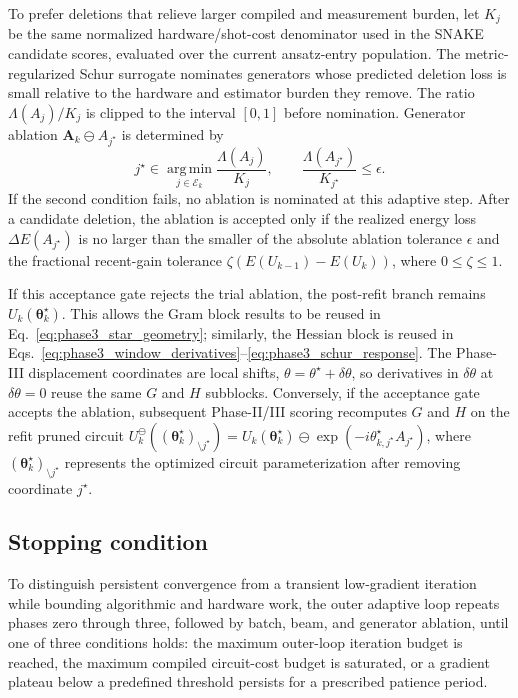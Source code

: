 \documentclass[
  reprint,
  amsmath,
  amssymb,
  aps,
  pra,
  nofootinbib,
  superscriptaddress,
  floatfix
]{revtex4-2}
\begin{document}
To prefer deletions that relieve larger compiled and measurement burden, let
\(K_j\) be the same normalized hardware/shot-cost denominator used in the SNAKE
candidate scores, evaluated over the current ansatz-entry population. The
metric-regularized Schur surrogate nominates generators whose predicted
deletion loss is small relative to the hardware and estimator burden they
remove. The ratio
\(\Lambda(A_j)/K_j\) is clipped to the interval \([0,1]\) before nomination.
Generator ablation \(\mathbf A_k\ominus A_{j^\star}\) is determined by
\begin{equation*}
j^\star
\in
\operatorname*{arg\,min}_{j\in\mathcal E_k}
\frac{\Lambda(A_j)}{K_j},
\qquad
\frac{\Lambda(A_{j^\star})}{K_{j^\star}}
\le
\epsilon .
\end{equation*}
If the second condition fails, no ablation is nominated at this adaptive step.
After a candidate deletion, the ablation is accepted only if the realized energy
loss \(\Delta E(A_{j^\star})\) is no larger than the smaller of the absolute
ablation tolerance \(\epsilon\) and the fractional recent-gain tolerance
\(\zeta\left(E(U_{k-1})-E(U_k)\right)\), where \(0\le\zeta\le1\).

If this acceptance gate rejects the trial ablation, the post-refit
branch remains \(U_k(\boldsymbol\theta_k^\star)\). This allows the Gram block results to be
reused in Eq.~\eqref{eq:phase3_star_geometry}; similarly, the Hessian block is reused in
Eqs.~\eqref{eq:phase3_window_derivatives}--\eqref{eq:phase3_schur_response}.
The Phase-III displacement coordinates are local
shifts, \(\theta=\theta^\star+\delta\theta\), so derivatives in
\(\delta\theta\) at \(\delta\theta=0\) reuse the same \(G\) and \(H\)
subblocks. Conversely, if the acceptance gate accepts the ablation, subsequent Phase-II/III
scoring recomputes \(G\) and \(H\) on the refit pruned circuit
\(U_k^{\ominus}((\boldsymbol\theta_k^\star)_{\setminus j^\star})
=
U_k(\boldsymbol\theta_k^\star)\ominus
\exp(-i\theta_{k,j^\star}^\star A_{j^\star})\), where \((\boldsymbol\theta_k^\star)_{\setminus j^\star}\) represents the optimized circuit parameterization after removing coordinate \(j^\star\).



\subsection{Stopping condition}
To distinguish persistent convergence from a transient low-gradient iteration
while bounding algorithmic and hardware work, the outer adaptive loop repeats
phases zero through three, followed by batch, beam, and generator ablation,
until one of three conditions holds: the maximum outer-loop iteration budget is
reached, the maximum compiled circuit-cost budget is saturated, or a gradient
plateau below a predefined threshold persists for a prescribed patience
period.
\end{document}
